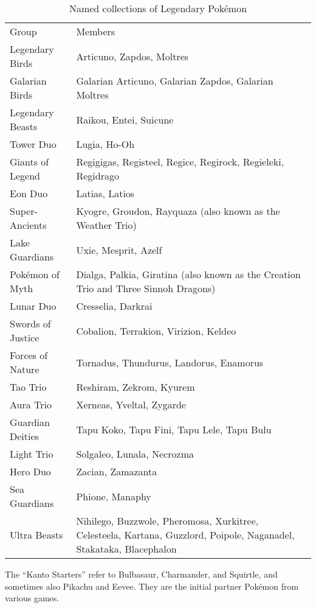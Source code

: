 \begin{table}
\begin{tabular}{lp{}}
Group & Members\\
\Midrule
Legendary Birds & Articuno, Zapdos, Moltres\\
Galarian Birds & Galarian Articuno, Galarian Zapdos, Galarian Moltres\\
Legendary Beasts & Raikou, Entei, Suicune\\
Tower Duo & Lugia, Ho-Oh\\
Giants of Legend & Regigigas, Registeel, Regice, Regirock, Regieleki, Regidrago\\
Eon Duo & Latias, Latios\\
Super-Ancients & Kyogre, Groudon, Rayquaza (also known as the Weather Trio)\\
Lake Guardians & Uxie, Mesprit, Azelf\\
Pokémon of Myth & Dialga, Palkia, Giratina (also known as the Creation Trio and Three Sinnoh Dragons)\\
Lunar Duo & Cresselia, Darkrai\\
Swords of Justice & Cobalion, Terrakion, Virizion, Keldeo\\
Forces of Nature & Tornadus, Thundurus, Landorus, Enamorus\\
Tao Trio & Reshiram, Zekrom, Kyurem\\
Aura Trio & Xerneas, Yveltal, Zygarde\\
Guardian Deities & Tapu Koko, Tapu Fini, Tapu Lele, Tapu Bulu\\
Light Trio & Solgaleo, Lunala, Necrozma\\
Hero Duo & Zacian, Zamazanta\\
Sea Guardians & Phione, Manaphy\\
Ultra Beasts & Nihilego, Buzzwole, Pheromosa, Xurkitree, Celesteela, Kartana, Guzzlord,
               Poipole, Naganadel, Stakataka, Blacephalon \\
\end{tabular}
\caption{Named collections of Legendary Pokémon\label{table:namedmyths}}
\end{table}

\begin{tipbox}[title=Kanto Starters]
The ``Kanto Starters'' refer to Bulbasaur, Charmander, and Squirtle, and sometimes
  also Pikachu and Eevee.
They are the initial partner Pokémon from various games.
\end{tipbox}

